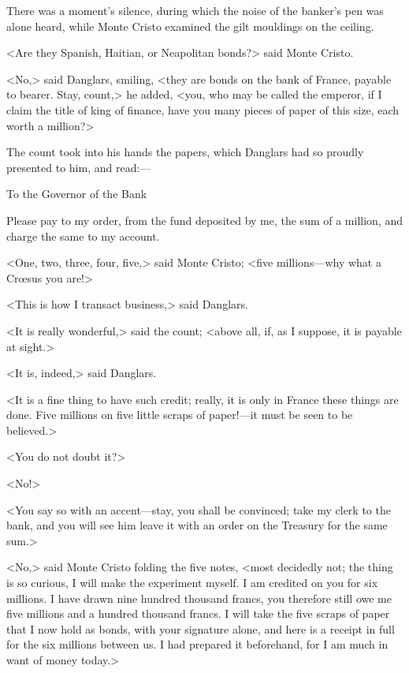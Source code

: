  There was a moment's silence, during which the noise of the banker's pen was alone heard, while Monte Cristo examined the gilt mouldings on the ceiling. 

 <Are they Spanish, Haitian, or Neapolitan bonds?> said Monte Cristo. 

 <No,> said Danglars, smiling, <they are bonds on the bank of France, payable to bearer. Stay, count,> he added, <you, who may be called the emperor, if I claim the title of king of finance, have you many pieces of paper of this size, each worth a million?> 

 The count took into his hands the papers, which Danglars had so proudly presented to him, and read:— 

\begin{mail}{}{To the Governor of the Bank}
	
Please pay to my order, from the fund deposited by me, the sum of a million, and charge the same to my account. 

\end{mail}

 <One, two, three, four, five,> said Monte Cristo; <five millions—why what a Crœsus you are!> 

 <This is how I transact business,> said Danglars. 

 <It is really wonderful,> said the count; <above all, if, as I suppose, it is payable at sight.> 

 <It is, indeed,> said Danglars. 

 <It is a fine thing to have such credit; really, it is only in France these things are done. Five millions on five little scraps of paper!—it must be seen to be believed.> 

 <You do not doubt it?> 

 <No!> 

 <You say so with an accent—stay, you shall be convinced; take my clerk to the bank, and you will see him leave it with an order on the Treasury for the same sum.> 

 <No,> said Monte Cristo folding the five notes, <most decidedly not; the thing is so curious, I will make the experiment myself. I am credited on you for six millions. I have drawn nine hundred thousand francs, you therefore still owe me five millions and a hundred thousand francs. I will take the five scraps of paper that I now hold as bonds, with your signature alone, and here is a receipt in full for the six millions between us. I had prepared it beforehand, for I am much in want of money today.> 

